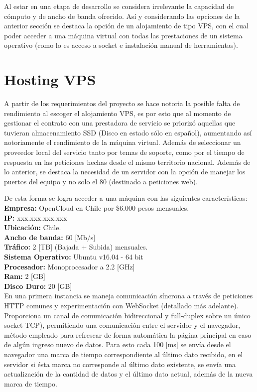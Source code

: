 Al estar en una etapa de desarrollo se considera irrelevante la capacidad de cómputo y de ancho de banda ofrecido. Así y considerando las opciones de la anterior sección se destaca la opción de un alojamiento de tipo VPS, con el cual poder acceder a una máquina virtual con todas las prestaciones de un sistema operativo (como lo es acceso a socket e instalación manual de herramientas).

\newpage
\section{Hosting VPS}

A partir de los requerimientos del proyecto se hace notoria la posible falta de rendimiento al escoger el alojamiento VPS, es por esto que al momento de gestionar el contrato con una prestadora de servicio se priorizó aquellas que tuvieran almacenamiento SSD (Disco en estado sólo en español), aumentando así notoriamente el rendimiento de la máquina virtual. Además de seleccionar un proveedor local del servicio tanto por temas de soporte, como por el tiempo de respuesta en las peticiones hechas desde el mismo territorio nacional. Además de lo anterior, se destaca la necesidad de un servidor con la opción de manejar los puertos del equipo y no solo el 80 (destinado a peticiones web).

De esta forma se logra acceder a una máquina con las siguientes características:
\textbf{Empresa:} OpenCloud en Chile por \$6.000 pesos mensuales.\\ 
\textbf{IP:} xxx.xxx.xxx.xxx\\
\textbf{Ubicación:} Chile.\\
\textbf{Ancho de banda:} 60 [Mb/s]\\
\textbf{Tráfico:} 2 [TB] (Bajada + Subida) mensuales.\\
\textbf{Sistema Operativo:} Ubuntu v16.04 - 64 bit\\
\textbf{Procesador:} Monoprocesador a 2.2 [GHz]\\
\textbf{Ram:} 2 [GB]\\
\textbf{Disco Duro:} 20 [GB]\\
\newpage
En una primera instancia se maneja comunicación síncrona a través de peticiones HTTP comunes y experimentación con WebSocket (detallado más adelante).
Proporciona un canal de comunicación bidireccional y full-duplex sobre un único socket TCP), permitiendo una comunicación entre el servidor y el navegador, método empleado para refrescar de forma automática la página principal en caso de algún ingreso nuevo de datos. 
Para esto cada 100 [ms] se envía desde el navegador una marca de tiempo correspondiente al último dato recibido, en el servidor si ésta marca no corresponde al último dato existente, se envía una actualización de la cantidad de datos y el último dato actual, además de la nueva marca de tiempo.


